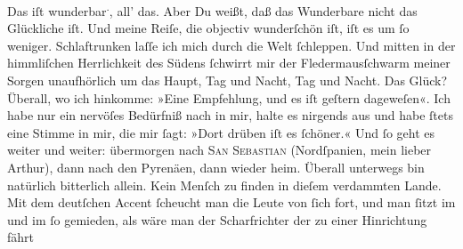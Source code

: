 \pstart
           Das iſt wunderbar\substVorne{}\textsuperscript{.}\substDazwischen{},\substHinten{} all’ das. Aber Du {\pb}weißt, daß das
               Wunderbare nicht das Glückliche iſt. Und meine Reiſe, die objectiv wunderſchön iſt,
               iſt es \label{T_L02701-1v}\label{T_L02701-1} um ſo weniger. Schlaftrunken laſſe ich mich durch die Welt
               ſchleppen. Und mitten in\strikeout{\textcolor{gray}{s}} der himmliſchen Herrlichkeit des Südens ſchwirrt mir der Fledermausſchwarm
               meiner Sorgen unaufhörlich um das Haupt, Tag und Nacht, Tag und Nacht. Das Glück?
               Überall, wo ich hinkomme: »Eine Empfehlung, {\pb}und es
               iſt geſtern dageweſen«. Ich habe nur ein nervöſes Bedürfniß nach \label{K_L02701-4v}\label{K_L02701-4} in mir, halte es
               nirgends aus und habe ſtets eine Stimme in mir, die mir ſagt: »Dort drüben iſt es
               ſchöner.« Und ſo geht es weiter und weiter: übermorgen
               nach \textsc{San Sebastian} (Nordſpanien, mein lieber Arthur), dann
               nach den Pyrenäen, dann wieder heim. Überall
               unterwegs bin natürlich {\pb}bitterlich allein. Kein
               Menſch zu finden in dieſem verdammten Lande. Mit dem deutſchen Accent ſcheucht man
               die Leute von ſich fort,  und man ſitzt im \label{K_L02701-5v}\label{K_L02701-5} und im \label{T_L02701-2v}\label{T_L02701-2} ſo
               gemieden, als wäre man der Scharfrichter der zu einer Hinrichtung fährt{\dotsfour}\pend
           
